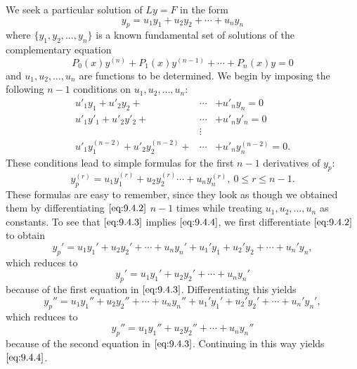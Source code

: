 \documentclass{ximera}
\begin{document}
We seek a particular solution of $Ly=F$ in the form
\begin{equation} \label{eq:9.4.2}
y_p=u_1y_1+u_2y_2+\cdots+u_ny_n
\end{equation}
where $\{y_1,y_2,\dots,y_n\}$ is a known fundamental set of solutions
of the complementary equation
$$
P_0(x)y^{(n)}+P_1(x)y^{(n-1)}+\cdots+P_n(x)y=0
$$
and $u_1, u_2, \dots, u_n$ are functions to be determined. We begin by
imposing the following $n-1$ conditions on $u_1,u_2,\dots,u_n$:
\begin{equation} \label{eq:9.4.3}
\begin{array}{rcl}
u'_1y_1+u'_2y_2+&\cdots&+u'_ny_n=0 \\
u'_1y'_1+u'_2y'_2+&\cdots&+u'_ny'_n=0 \\
&\vdots& \\
u'_1y_1^{(n-2)}+u'_2y^{(n-2)}_2+&\cdots&+u'_ny^{(n-2)}_n
=0.
\end{array}
\end{equation}
These conditions lead to simple formulas for the first $n-1$
derivatives of $y_p$:
\begin{equation} \label{eq:9.4.4}
y^{(r)}_p=u_1y^{(r)}_1+u_2y_2^{(r)}\cdots+u_ny^{(r)}_n,\ 0
\leq r \leq n-1.
\end{equation}
These formulas are easy to remember, since they look as though we
obtained them by differentiating $\eqref{eq:9.4.2}$ $n-1$ times while
treating $u_1, u_2, \dots, u_n$ as constants. To see that
$\eqref{eq:9.4.3}$
implies $\eqref{eq:9.4.4}$, we first differentiate $\eqref{eq:9.4.2}$ to obtain
$$
y_p'=u_1y_1'+u_2y_2'+\cdots+u_ny_n'+u_1'y_1+u_2'y_2+\cdots+u_n'y_n,
$$
which  reduces to
$$
y_p'=u_1y_1'+u_2y_2'+\cdots+u_ny_n'
$$
because of the first equation in $\eqref{eq:9.4.3}$. Differentiating this
yields
$$
y_p''=u_1y_1''+u_2y_2''+\cdots+u_ny_n''+u_1'y_1'+u_2'y_2'+\cdots+u_n'y_n',
$$
which reduces to
$$
y_p''=u_1y_1''+u_2y_2''+\cdots+u_ny_n''
$$
because of  the second equation in $\eqref{eq:9.4.3}$.
Continuing in this way yields $\eqref{eq:9.4.4}$.
\end{document}
